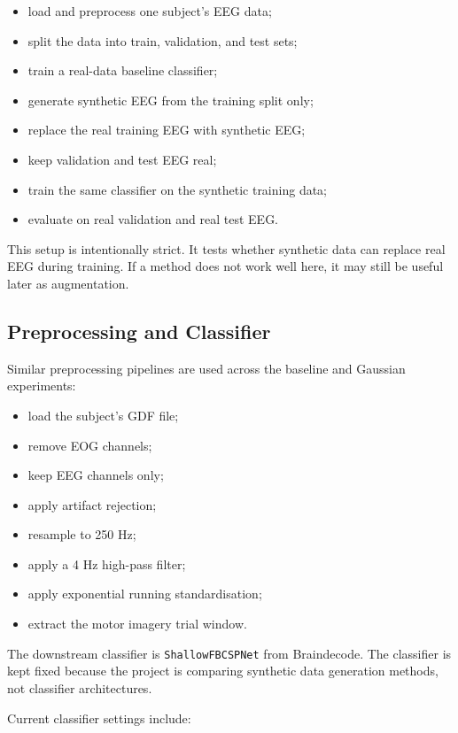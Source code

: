 \documentclass[conference]{IEEEtran}
\begin{document}
\begin{itemize}
\item load and preprocess one subject's EEG data;
\item split the data into train, validation, and test sets;
\item train a real-data baseline classifier;
\item generate synthetic EEG from the training split only;
\item replace the real training EEG with synthetic EEG;
\item keep validation and test EEG real;
\item train the same classifier on the synthetic training data;
\item evaluate on real validation and real test EEG.
\end{itemize}

This setup is intentionally strict. It tests whether synthetic data can replace real EEG during training. If a method does not work well here, it may still be useful later as augmentation.

\vspace{0.5em}

\subsection{Preprocessing and Classifier}

Similar preprocessing pipelines are used across the baseline and Gaussian experiments:

\begin{itemize}
\item load the subject's GDF file;
\item remove EOG channels;
\item keep EEG channels only;
\item apply artifact rejection;
\item resample to 250 Hz;
\item apply a 4 Hz high-pass filter;
\item apply exponential running standardisation;
\item extract the motor imagery trial window.
\end{itemize}

The downstream classifier is \texttt{ShallowFBCSPNet} from Braindecode. The classifier is kept fixed because the project is comparing synthetic data generation methods, not classifier architectures.

Current classifier settings include:
\end{document}
